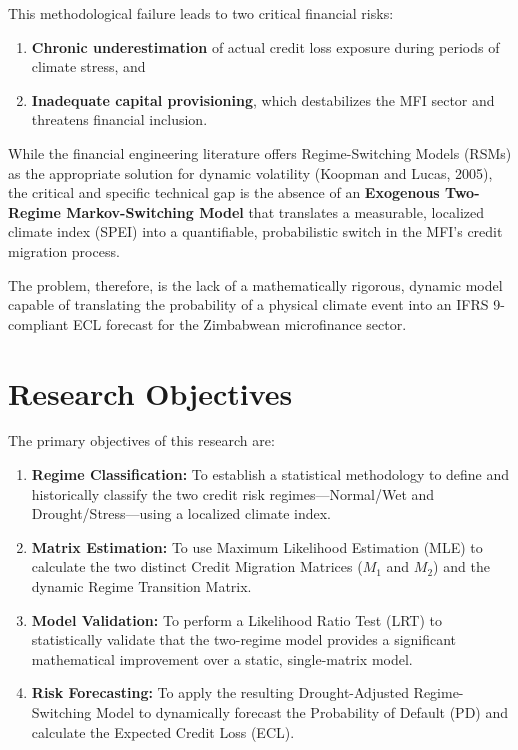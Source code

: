 \documentclass[12pt,a4paper]{article}
\begin{document}
This methodological failure leads to two critical financial risks:
\begin{enumerate}[noitemsep]
    \item \textbf{Chronic underestimation} of actual credit loss exposure during periods of climate stress, and
    \item \textbf{Inadequate capital provisioning}, which destabilizes the MFI sector and threatens financial inclusion.
\end{enumerate}

While the financial engineering literature offers Regime-Switching Models (RSMs) as the appropriate solution for dynamic volatility (Koopman and Lucas, 2005), the critical and specific technical gap is the absence of an \textbf{Exogenous Two-Regime Markov-Switching Model} that translates a measurable, localized climate index (SPEI) into a quantifiable, probabilistic switch in the MFI's credit migration process.

The problem, therefore, is the lack of a mathematically rigorous, dynamic model capable of translating the probability of a physical climate event into an IFRS 9-compliant ECL forecast for the Zimbabwean microfinance sector.

\section{Research Objectives}

The primary objectives of this research are:

\begin{enumerate}[noitemsep]
    \item \textbf{Regime Classification:} To establish a statistical methodology to define and historically classify the two credit risk regimes---Normal/Wet and Drought/Stress---using a localized climate index.
    
    \item \textbf{Matrix Estimation:} To use Maximum Likelihood Estimation (MLE) to calculate the two distinct Credit Migration Matrices ($M_1$ and $M_2$) and the dynamic Regime Transition Matrix.
    
    \item \textbf{Model Validation:} To perform a Likelihood Ratio Test (LRT) to statistically validate that the two-regime model provides a significant mathematical improvement over a static, single-matrix model.
    
    \item \textbf{Risk Forecasting:} To apply the resulting Drought-Adjusted Regime-Switching Model to dynamically forecast the Probability of Default (PD) and calculate the Expected Credit Loss (ECL).
\end{enumerate}
\end{document}
